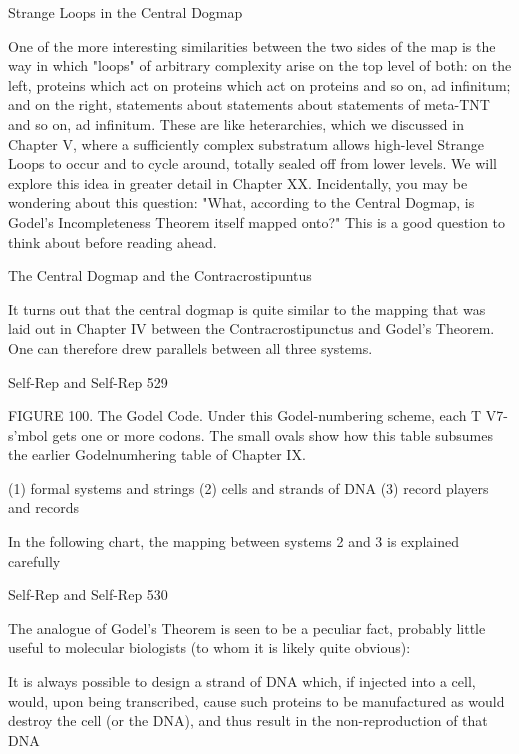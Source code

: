 {                          Strange Loops in the Central Dogmap

One of the more interesting similarities between the two sides of the map is the way in which
"loops" of arbitrary complexity arise on the top level of both: on the left, proteins which act
on proteins which act on proteins and so on, ad infinitum; and on the right, statements about
statements about statements of meta-TNT and so on, ad infinitum. These are like
heterarchies, which we discussed in Chapter V, where a sufficiently complex substratum
allows high-level Strange Loops to occur and to cycle around, totally sealed off from lower
levels. We will explore this idea in greater detail in Chapter XX.
        Incidentally, you may be wondering about this question: "What, according to the
Central Dogmap, is Godel's Incompleteness Theorem itself mapped onto?" This is a good
question to think about before reading ahead.

                    The Central Dogmap and the Contracrostipuntus

  It turns out that the central dogmap is quite similar to the mapping that was laid out in
Chapter IV between the Contracrostipunctus and Godel’s Theorem. One can therefore drew
parallels between all three systems.




Self-Rep and Self-Rep                                                                      529

FIGURE 100. The Godel Code. Under this Godel-numbering scheme, each T V7- s'mbol gets
one or more codons. The small ovals show how this table subsumes the earlier
Godelnumhering table of Chapter IX.

(1) formal systems and strings
(2) cells and strands of DNA
(3) record players and records


In the following chart, the mapping between systems 2 and 3 is explained carefully




Self-Rep and Self-Rep                                                                530

The analogue of Godel's Theorem is seen to be a peculiar fact, probably little useful to
molecular biologists (to whom it is likely quite obvious):

    It is always possible to design a strand of DNA which, if injected into a cell, would,
    upon being transcribed, cause such proteins to be manufactured as would destroy the cell
    (or the DNA), and thus result in the non-reproduction of that DNA

}
